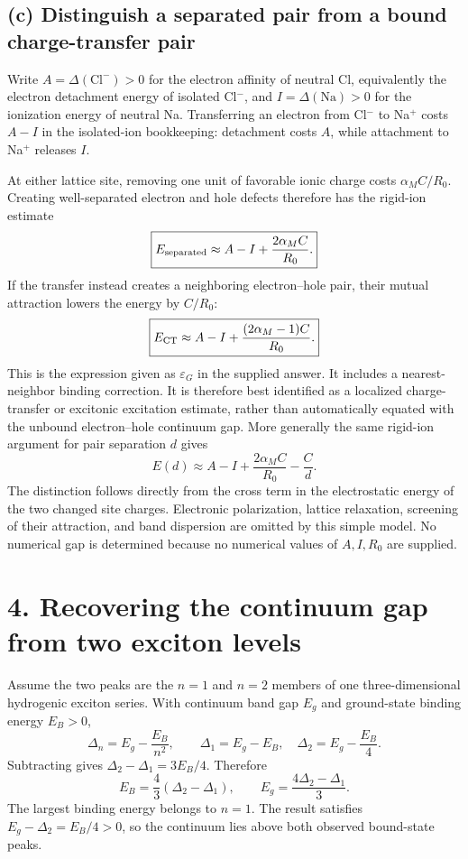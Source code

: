 \subsection*{(c) Distinguish a separated pair from a bound charge-transfer pair}
Write $A=\Delta(\mathrm{Cl}^-)>0$ for the electron affinity of neutral Cl, equivalently the electron detachment energy of isolated Cl$^-$, and $I=\Delta(\mathrm{Na})>0$ for the ionization energy of neutral Na. Transferring an electron from Cl$^-$ to Na$^+$ costs $A-I$ in the isolated-ion bookkeeping: detachment costs $A$, while attachment to Na$^+$ releases $I$.

At either lattice site, removing one unit of favorable ionic charge costs $\alpha_M C/R_0$. Creating well-separated electron and hole defects therefore has the rigid-ion estimate
\[
\boxed{E_{\rm separated}\approx A-I+\frac{2\alpha_M C}{R_0}.}
\]
If the transfer instead creates a neighboring electron--hole pair, their mutual attraction lowers the energy by $C/R_0$:
\[
\boxed{E_{\rm CT}\approx A-I+\frac{(2\alpha_M-1)C}{R_0}.}
\]
This is the expression given as $\varepsilon_G$ in the supplied answer. It includes a nearest-neighbor binding correction. It is therefore best identified as a localized charge-transfer or excitonic excitation estimate, rather than automatically equated with the unbound electron--hole continuum gap. More generally the same rigid-ion argument for pair separation $d$ gives
\[
E(d)\approx A-I+\frac{2\alpha_M C}{R_0}-\frac C d.
\]
The distinction follows directly from the cross term in the electrostatic energy of the two changed site charges. Electronic polarization, lattice relaxation, screening of their attraction, and band dispersion are omitted by this simple model. No numerical gap is determined because no numerical values of $A,I,R_0$ are supplied.

\section*{4. Recovering the continuum gap from two exciton levels}
Assume the two peaks are the $n=1$ and $n=2$ members of one three-dimensional hydrogenic exciton series. With continuum band gap $E_g$ and ground-state binding energy $E_B>0$,
\[
\Delta_n=E_g-\frac{E_B}{n^2},\qquad
\Delta_1=E_g-E_B,\quad \Delta_2=E_g-\frac{E_B}{4}.
\]
Subtracting gives $\Delta_2-\Delta_1=3E_B/4$. Therefore
\[
\boxed{E_B=\frac43(\Delta_2-\Delta_1)},\qquad
\boxed{E_g=\frac{4\Delta_2-\Delta_1}{3}.}
\]
The largest binding energy belongs to $n=1$. The result satisfies $E_g-\Delta_2=E_B/4>0$, so the continuum lies above both observed bound-state peaks.

